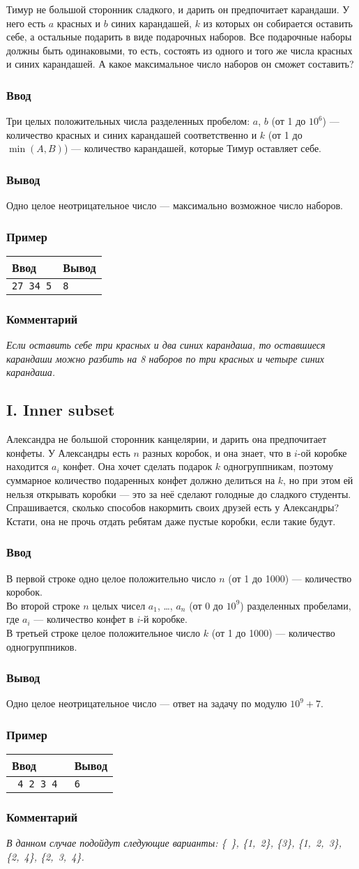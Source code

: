 \documentclass[10pt, a4paper]{article}
\newcommand{\informat}[1]
{
	\subsubsection*{Ввод} #1
}
\newcommand{\outformat}[1]
{
	\subsubsection*{Вывод} #1
}
\newcommand{\example}[2]
{
	\subsubsection*{Пример}
	\noindent
	\begin{center}
	\begin{tabularx}{\linewidth}{|X|X|}
	\hline
	Ввод & Вывод \\
	\hline
	{\tt #1} & {\tt #2}		\\
	\hline
	\end{tabularx}
	\end{center}
}
\newcommand{\excomm}[1]
{
	\subsubsection*{Комментарий}
	\textit{#1}
}
\begin{document}
Тимур не большой сторонник сладкого, и дарить он предпочитает карандаши. У него есть $a$ красных и $b$ синих карандашей, $k$ из которых он собирается оставить себе, а остальные подарить в виде подарочных наборов. Все подарочные наборы должны быть одинаковыми, то есть, состоять из одного и того же числа красных и синих карандашей. А какое максимальное число наборов он сможет составить?

\informat{Три целых положительных числа разделенных пробелом: $a$, $b$ (от 1 до $10^6$) --- количество красных и синих карандашей соответственно и $k$ (от 1 до $\min(A, B)$) --- количество карандашей, которые Тимур оставляет себе.}

\outformat{Одно целое неотрицательное число --- максимально возможное число наборов.}

\example{27 34 5}{8}

\excomm{Если оставить себе три красных и два синих карандаша, то оставшиеся карандаши можно разбить на 8 наборов по три красных и четыре синих карандаша.}



\subsection*{I. Inner subset}

Александра не большой сторонник канцелярии, и дарить она предпочитает конфеты. У Александры есть $n$ разных коробок, и она знает, что в $i$-ой коробке находится $a_i$ конфет. Она хочет сделать подарок $k$ одногруппникам, поэтому суммарное количество подаренных конфет должно делиться на $k$, но при этом ей нельзя открывать коробки --- это за неё сделают голодные до сладкого студенты. Спрашивается, сколько способов накормить своих друзей есть у Александры? Кстати, она не прочь отдать ребятам даже пустые коробки, если такие будут.

\informat{В первой строке одно целое положительно число $n$ (от 1 до 1000) --- количество коробок.\\ Во второй строке $n$ целых чисел $a_1$, …, $a_n$ (от 0 до $10^9$) разделенных пробелами, где $a_i$ --- количество конфет в $i$-й коробке.\\ В третьей строке целое положительное число $k$ (от 1 до 1000) --- количество одногруппников.}

\outformat{Одно целое неотрицательное число --- ответ на задачу по модулю $10^9 + 7$.}

\example{%
4 		\newline 
1 2 3 4 \newline
3		}{6}

\excomm{В данном случае подойдут следующие варианты: \{~\}, \{1,~2\}, \{3\}, \{1,~2,~3\}, \{2,~4\}, \{2,~3,~4\}.}
\end{document}
